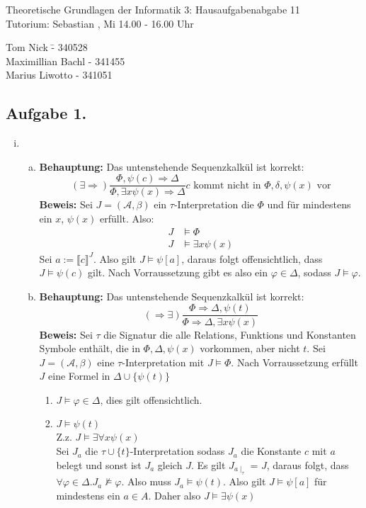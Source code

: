 \documentclass[a4paper,10pt]{article}
\begin{document}
\begin{center}
\Large{Theoretische Grundlagen der Informatik 3: Hausaufgabenabgabe 11} \\
\large{Tutorium: Sebastian , Mi 14.00 - 16.00 Uhr}
\end{center}
\begin{tabbing}
Tom Nick \hspace{2cm}\= - 340528\\
Maximillian Bachl \> - 341455 \\
Marius Liwotto\> -  341051
\end{tabbing}
\subsection*{Aufgabe 1.}
\begin{enumerate}[(i)]
	\item
	\begin{enumerate}[a)]
	
		\item \textbf{Behauptung: } Das untenstehende Sequenzkalkül ist korrekt:
		\[ (\exists \Rightarrow) \frac{\Phi, \psi(c) \Rightarrow \Delta}{\Phi, \exists x \psi(x)\Rightarrow \Delta} c \text{ kommt nicht in $\Phi,\delta,\psi(x)$ vor}\]
		\textbf{Beweis:} 
		Sei $J = (\mathcal{A},\beta)$ ein $\tau$-Interpretation die $\Phi$ und für mindestens ein $x$, $\psi(x)$ erfüllt. Also:
		\begin{align*}
			J &\vDash \Phi \\
			J &\vDash \exists x \psi(x)
		\end{align*}
		Sei $a := \llbracket c \rrbracket^{J}$. Also gilt $J \vDash \psi[a]$, daraus folgt offensichtlich, dass $J \vDash \psi(c)$ gilt. Nach Vorraussetzung gibt es also ein $\varphi \in \Delta$, sodass $J \vDash \varphi$.
		\item \textbf{Behauptung: } Das untenstehende Sequenzkalkül ist korrekt:
		\[ (\Rightarrow \exists) \frac{\Phi \Rightarrow \Delta,\psi(t)}{\Phi \Rightarrow \Delta, \exists x \psi (x)} \]
		\textbf{Beweis:} 
		Sei $\tau$ die Signatur die alle Relations, Funktions und Konstanten Symbole enthält, die in $\Phi, \Delta, \psi(x)$ vorkommen, aber nicht $t$.
		Sei $J = (\mathcal{A},\beta)$ eine $\tau$-Interpretation mit $J \vDash \Phi$.
		Nach Vorraussetzung erfüllt $J$ eine Formel in $\Delta \cup \{ \psi(t) \}$
		\begin{enumerate}
			\item $J \vDash \varphi \in \Delta$, dies gilt offensichtlich.
			\item $J \vDash \psi(t)$ \\
			Z.z. $J \vDash \exists \forall x \psi(x)$ \\
			Sei $J_a$ die $\tau \cup \{t\}$-Interpretation sodass $J_a$ die Konstante $c$ mit $a$ belegt und sonst ist $J_a$ gleich $J$.
			Es gilt $J_{a\mid_\tau}$ = $J$, daraus folgt, dass $\forall \varphi \in \Delta.J_a \not \vDash \varphi$. Also muss $J_a \vDash \psi(t)$.
			Also gilt $J \vDash \psi[a]$ für mindestens ein $a \in A$. Daher also $J \vDash \exists \psi (x)$
		\end{enumerate}
	\end{enumerate}
\end{enumerate}

	
\end{document}
